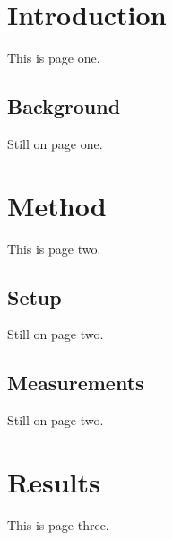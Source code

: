 \documentclass{article}
\begin{document}
\section{Introduction}
This is page one.
\subsection{Background}
Still on page one.
\newpage
\section{Method}
This is page two.
\subsection{Setup}
Still on page two.
\subsection{Measurements}
Still on page two.
\newpage
\section{Results}
This is page three.
\end{document}
